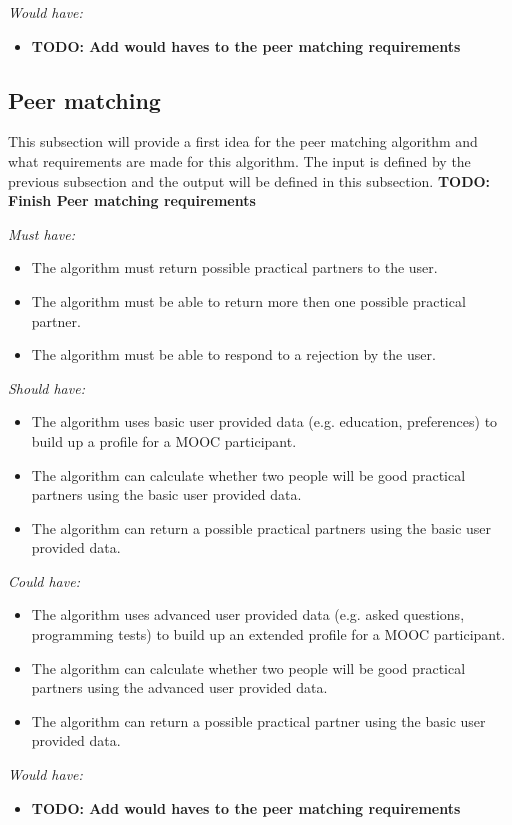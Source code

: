 \documentclass[]{article}
\newcommand{\TODO}[1]{{\color{red}\textbf{TODO: #1}}}
\newcommand{\reqr}[1]{{\noindent\emph{#1:}}}
\begin{document}
\reqr{Would have}
\begin{itemize}
\item \TODO{Add would haves to the peer matching requirements}
\end{itemize}

\subsection{Peer matching}
This subsection will provide a first idea for the peer matching algorithm and what requirements are made for this algorithm.
The input is defined by the previous subsection and the output will be defined in this subsection.
\TODO{Finish Peer matching requirements}

\reqr{Must have}
\begin{itemize}
\item The algorithm must return possible practical partners to the user.
\item The algorithm must be able to return more then one possible practical partner.
\item The algorithm must be able to respond to a rejection by the user.
\end{itemize}

\reqr{Should have}
\begin{itemize}
\item The algorithm uses basic user provided data (e.g. education, preferences) to build up a profile for a MOOC participant.
\item The algorithm can calculate whether two people will be good practical partners using the basic user provided data.
\item The algorithm can return a possible practical partners using the basic user provided data.
\end{itemize}

\reqr{Could have}
\begin{itemize}
\item The algorithm uses advanced user provided data (e.g. asked questions, programming tests) to build up an extended profile for a MOOC participant.
\item The algorithm can calculate whether two people will be good practical partners using the advanced user provided data.
\item The algorithm can return a possible practical partner using the basic user provided data.
\end{itemize}

\reqr{Would have}
\begin{itemize}
\item \TODO{Add would haves to the peer matching requirements}
\end{itemize}
\end{document}
